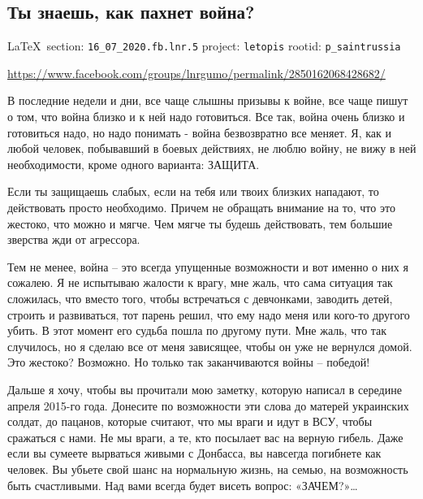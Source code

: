  
 
  
\subsection{Ты знаешь, как пахнет война?}
\vspace{0.5cm}
{\ifDEBUG\small\LaTeX~section: \verb|16_07_2020.fb.lnr.5| project: \verb|letopis| rootid: \verb|p_saintrussia|\fi}
\vspace{0.5cm}
  
\url{https://www.facebook.com/groups/lnrgumo/permalink/2850162068428682/}

В последние недели и дни, все чаще слышны призывы к войне, все чаще пишут о
том, что война близко и к ней надо готовиться. Все так, война очень близко и
готовиться надо, но надо понимать - война безвозвратно все меняет. Я, как и
любой человек, побывавший в боевых действиях, не люблю войну, не вижу в ней
необходимости, кроме одного варианта: ЗАЩИТА.

Если ты защищаешь слабых, если на тебя или твоих близких нападают, то
действовать просто необходимо. Причем не обращать внимание на то, что это
жестоко, что можно и мягче. Чем мягче ты будешь действовать, тем большие
зверства жди от агрессора.

Тем не менее, война – это всегда упущенные возможности и вот именно о них я
сожалею. Я не испытываю жалости к врагу, мне жаль, что сама ситуация так
сложилась, что вместо того, чтобы встречаться с девчонками, заводить детей,
строить и развиваться, тот парень решил, что ему надо меня или кого-то другого
убить. В этот момент его судьба пошла по другому пути. Мне жаль, что так
случилось, но я сделаю все от меня зависящее, чтобы он уже не вернулся домой.
Это жестоко? Возможно. Но только так заканчиваются войны – победой!

Дальше я хочу, чтобы вы прочитали мою заметку, которую написал в середине
апреля 2015-го года. Донесите по возможности эти слова до матерей украинских
солдат, до пацанов, которые считают, что мы враги и идут в ВСУ, чтобы сражаться
с нами. Не мы враги, а те, кто посылает вас на верную гибель. Даже если вы
сумеете вырваться живыми с Донбасса, вы навсегда погибнете как человек. Вы
убьете свой шанс на нормальную жизнь, на семью, на возможность быть
счастливыми. Над вами всегда будет висеть вопрос: «ЗАЧЕМ?»…

